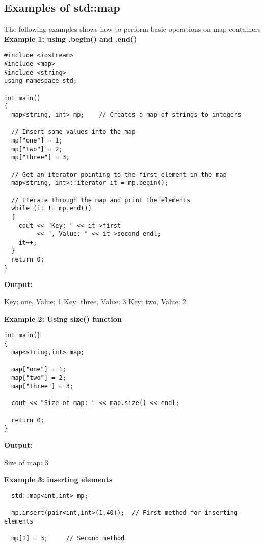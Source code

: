 \documentclass{report}
\begin{document}
\subsection*{Examples of std::map}
The following examples shows how to perform basic operations on map containers
\bigbreak \noindent
\textbf{Example 1: using .begin() and .end()}
\begin{verbatim}
#include <iostream>
#include <map>
#include <string>
using namespace std;

int main()
{
  map<string, int> mp;    // Creates a map of strings to integers

  // Insert some values into the map
  mp["one"] = 1;
  mp["two"] = 2;
  mp["three"] = 3;
  
  // Get an iterator pointing to the first element in the map
  map<string, int>::iterator it = mp.begin();

  // Iterate through the map and print the elements
  while (it != mp.end())
  {
    cout << "Key: " << it->first
         << ", Value: " << it->second endl;
    it++;
  }
  return 0;
}
\end{verbatim}
 \noindent
\textbf{Output:}
\begin{mdframed}
 Key: one, Value: 1 
 \bigbreak \noindent
 Key: three, Value: 3 
 \bigbreak \noindent
 Key: two, Value: 2 
\end{mdframed}
\textbf{Example 2: Using size() function}
\begin{verbatim}
int main(}
{
  map<string,int> map;

  map["one"] = 1;
  map["two"] = 2;
  map["three"] = 3;

  cout << "Size of map: " << map.size() << endl;

  return 0;
}
\end{verbatim}
\textbf{Output:}
\begin{mdframed}
  \vspace{.5mm}
  Size of map: 3  
\end{mdframed}
  \vspace{.5mm}
  \textbf{Example 3: inserting elements }
  \begin{verbatim}
  std::map<int,int> mp;

  mp.insert(pair<int,int>(1,40));  // First method for inserting elements

  mp[1] = 3;     // Second method
  \end{verbatim}
\end{document}
